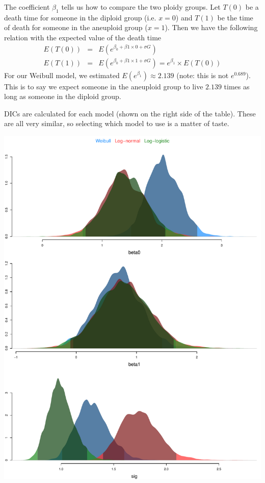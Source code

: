\documentclass[12pt]{article}
\begin{document}
\noindent The coefficient $\beta_1$ tells us how to compare the two ploidy groups. Let $T(0)$ be a death time for someone in the diploid group (i.e. $x=0$) and $T(1)$ be the time of death for someone in the aneuploid group ($x=1$). Then we have the following relation with the expected value of the death time
\begin{eqnarray*}
E(T(0)) &=& E(e^{\beta_0+\beta1\times 0+\sigma G}) \\
E(T(1)) &=& E(e^{\beta_0+\beta1\times 1+\sigma G})=e^{\beta_1}\times E(T(0))
\end{eqnarray*}
\noindent For our Weibull model, we estimated $E(e^{\beta_1})\approx2.139$ (note: this is not $e^{0.689}$). This is to say we expect someone in the aneuploid group to live $2.139$ times as long as someone in the diploid group.
\bigskip

\noindent DICs are calculated for each model (shown on the right side of the table). These are all very similar, so selecting which model to use is a matter of taste.

\begin{center}
\includegraphics[scale=0.70]{bc_posterior.pdf}
\end{center}
\end{document}
